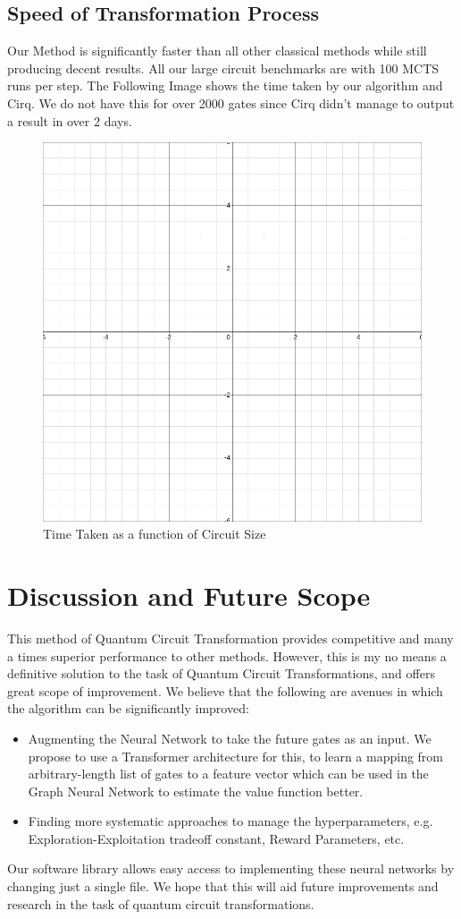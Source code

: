\documentclass[%
 reprint,
 amsmath,amssymb,
 aps,
]{revtex4-2}
\begin{document}
\subsection{\label{sec:results-rnd}Speed of Transformation Process}

Our Method is significantly faster than all other classical methods while still producing decent results. All our large circuit benchmarks are with 100 MCTS runs per step. The Following Image shows the time taken by our algorithm and Cirq. We do not have this for over 2000 gates since Cirq didn't manage to output a result in over 2 days.

\begin{figure}[H]
    \centering
    \includegraphics[width=0.6\linewidth]{images/dummy_plot.png}
    \caption{Time Taken as a function of Circuit Size}
    \label{fig:results-time}
\end{figure}

\section{Discussion and Future Scope}

This method of Quantum Circuit Transformation provides competitive and many a times superior performance to other methods. However, this is my no means a definitive solution to the task of Quantum Circuit Transformations, and offers great scope of improvement. We believe that the following are avenues in which the algorithm can be significantly improved:
\begin{itemize}
    \item Augmenting the Neural Network to take the future gates as an input. We propose to use a Transformer architecture for this, to learn a mapping from arbitrary-length list of gates to a feature vector which can be used in the Graph Neural Network to estimate the value function better.
    \item Finding more systematic approaches to manage the hyperparameters, e.g. Exploration-Exploitation tradeoff constant, Reward Parameters, etc.
\end{itemize}
Our software library allows easy access to implementing these neural networks by changing just a single file. We hope that this will aid future improvements and research in the task of quantum circuit transformations.
\end{document}
